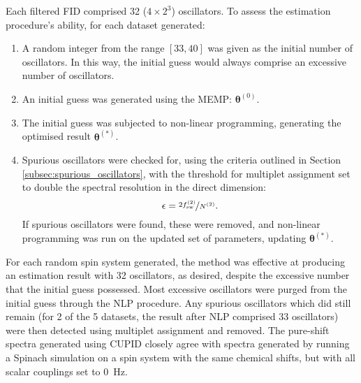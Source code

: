 Each filtered FID comprised 32 ($4 \times 2^3$) oscillators. To assess the
estimation procedure's ability, for each dataset generated:
\begin{enumerate}
    \item A random integer from the range $[33, 40]$ was given as the initial
        number of oscillators. In this way, the initial guess would always
        comprise an excessive number of oscillators.
    \item An initial guess was generated using the MEMP:
        $\symbf{\theta}^{(0)}$.
    \item The initial guess was subjected to non-linear programming, generating
        the optimised result $\symbf{\theta}^{(*)}$.
    \item Spurious oscillators were checked for, using the criteria outlined in
        Section \ref{subsec:spurious_oscillators}, with the threshold for
        multiplet assignment set to double the spectral resolution in the
        direct dimension:
        \[
            \epsilon = \nicefrac{2f_{\text{sw}}^{(2)}}{N^{(2)}}.
        \]
        If spurious oscillators were found, these were removed, and non-linear
        programming was run on the updated set of parameters, updating
        $\symbf{\theta}^{(*)}$.
\end{enumerate}
For each random spin system generated, the method was effective at producing an
estimation result with 32 oscillators, as desired, despite the excessive number
that the initial guess possessed. Most excessive oscillators were purged from
the initial guess through the NLP procedure. Any spurious oscillators which did
still remain (for 2 of the 5 datasets, the result after NLP comprised 33
oscillators) were then detected using multiplet assignment and removed. The
pure-shift spectra generated using CUPID closely agree with spectra generated
by running a Spinach simulation on a spin system with the same chemical shifts,
but with all scalar couplings set to \qty{0}{\hertz}.


